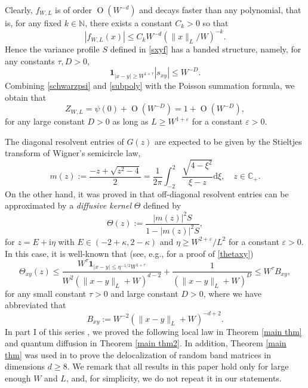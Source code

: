 \documentclass{article}
\newcommand{\1}{\mathds{1}}
\numberwithin{equation}{section}
\newcommand{\be}{\begin{equation}}
\newcommand{\ee}{\end{equation}}
\newcommand{\e}{{\varepsilon}}
\newcommand{\ii}{\mathrm{i}} %
\newcommand{\dd}{\mathrm{d}}
\renewcommand{\leq}{\leqslant}
\renewcommand{\geq}{\geqslant}
\renewcommand{\le}{\leq}
\renewcommand{\ge}{\geq}
\newcommand{\C}{\mathbb{C}}
\newcommand{\N}{\mathbb{N}}
\DeclareMathOperator{\OO}{O}
\theoremstyle{plain} %
\theoremstyle{remark}
\begin{document}
Clearly, $f_{W,L}$ is of order $\OO(W^{-d})$
and decays faster than any polynomial, that is, for any fixed $k\in \N$, there exists a constant $C_k>0$ so that
\be\label{subpoly}
|f_{W,L}(x)|\le C_k W^{-d}\left( {\|x\|_L}/{W}\right)^{-k}.%
\ee
Hence the variance profile $S$ defined in \eqref{sxyf}  has a banded structure, namely,  for any constants $\tau,D>0$,
\be\label{app compact f}
\mathbf 1_{|x-y|\ge W^{1+\tau}}|s_{xy}|\le W^{-D}.
\ee
Combining \eqref{schwarzpsi} and \eqref{subpoly} with the Poisson summation formula, we obtain that  
\be\label{bandcw1} 
Z_{W,L} =   \psi(0) + \OO(W^{-D})=1+ \OO(W^{-D}),
\ee
for any large constant $D>0$ as long as $L\ge W^{1+\e}$ for a constant $\e>0$. 



The diagonal resolvent entries of $G(z)$ are expected to be given by the Stieltjes transform of Wigner's semicircle law,
\be\label{msc}
m(z):=\frac{-z+\sqrt{z^2-4}}{2} = \frac{1}{2\pi}\int_{-2}^2 \frac{\sqrt{4-\xi^2}}{\xi-z}\dd\xi,\quad z\in \C_+.
\ee
On the other hand, it was proved in \cite{PartI_high} that off-diagonal resolvent entries can be approximated by a \emph{diffusive kernel} $\Theta$ defined by  %
\be\label{Thetapm}
\Theta(z):=\frac{|m(z)|^2 S}{1-|m(z)|^2 S} ,
\ee
for $z=E+\ii \eta$ with $E\in (-2+\kappa,2-\kappa)$ and $\eta\ge W^{2+\e}/L^2$ for a constant $\e>0$. In this case, it is well-known that (see, e.g., \cite{delocal,PartIII} for a proof of \eqref{thetaxy})
\be\label{thetaxy}
\Theta_{xy}(z) \le   \frac{W^\tau \mathbf 1_{|x-y|\le   \eta^{-1/2}W^{1+\tau}}}{W^2\left(\|x-y\|_{ L}+W\right)^{d-2}}   + \frac{1}{ \left(\|x-y\|_{ L}+W\right)^{D}}  \le W^{\tau} B_{xy},
\ee
for any small constant $\tau>0$ and large constant $D>0$, where we have abbreviated that 
\be\label{defnBxy}B_{xy}:=W^{-2}\left(\|x-y\|_{ L}+W\right)^{-d+2}.\ee 
In part I of this series \cite{PartI_high}, we proved the following local law in Theorem \ref{main thm} and quantum diffusion in Theorem \ref{main thm2}. In addition, Theorem \ref{main thm} was used in \cite{PartI_high} to prove the delocalization of random band matrices in dimensions $d\ge 8$. We remark that all results in this paper hold only for large enough $W$ and $L$, and, for simplicity, we do not repeat it in  our statements.
\end{document}
